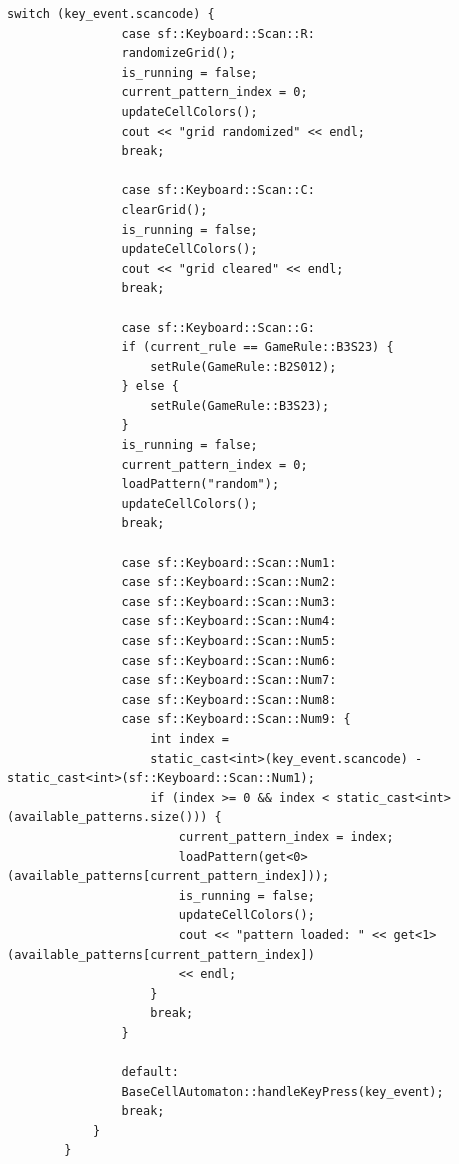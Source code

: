 \documentclass[14pt,a4paper]{extarticle}
\theoremstyle{plain}
\begin{document}
\begin{lstlisting}[title=live.cpp, gobble=16, breaklines=true, showspaces=false, showtabs=false, breakatwhitespace=true]
			switch (key_event.scancode) {
				case sf::Keyboard::Scan::R:
				randomizeGrid();
				is_running = false;
				current_pattern_index = 0;
				updateCellColors();
				cout << "grid randomized" << endl;
				break;
				
				case sf::Keyboard::Scan::C:
				clearGrid();
				is_running = false;
				updateCellColors();
				cout << "grid cleared" << endl;
				break;
				
				case sf::Keyboard::Scan::G:
				if (current_rule == GameRule::B3S23) {
					setRule(GameRule::B2S012);
				} else {
					setRule(GameRule::B3S23);
				}
				is_running = false;
				current_pattern_index = 0;
				loadPattern("random");
				updateCellColors();
				break;
				
				case sf::Keyboard::Scan::Num1:
				case sf::Keyboard::Scan::Num2:
				case sf::Keyboard::Scan::Num3:
				case sf::Keyboard::Scan::Num4:
				case sf::Keyboard::Scan::Num5:
				case sf::Keyboard::Scan::Num6:
				case sf::Keyboard::Scan::Num7:
				case sf::Keyboard::Scan::Num8:
				case sf::Keyboard::Scan::Num9: {
					int index =
					static_cast<int>(key_event.scancode) - static_cast<int>(sf::Keyboard::Scan::Num1);
					if (index >= 0 && index < static_cast<int>(available_patterns.size())) {
						current_pattern_index = index;
						loadPattern(get<0>(available_patterns[current_pattern_index]));
						is_running = false;
						updateCellColors();
						cout << "pattern loaded: " << get<1>(available_patterns[current_pattern_index])
						<< endl;
					}
					break;
				}
				
				default:
				BaseCellAutomaton::handleKeyPress(key_event);
				break;
			}
		}
	\end{lstlisting}
		
\end{document}
